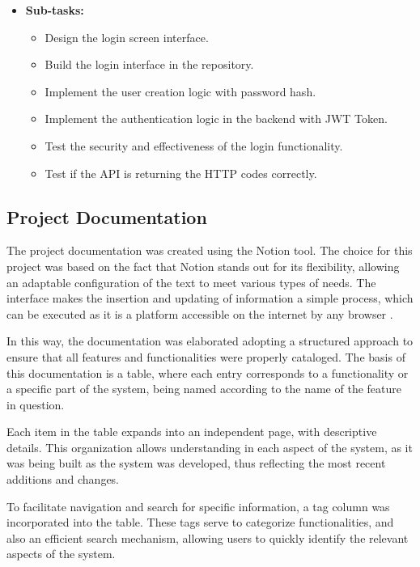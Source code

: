 \begin{itemize}
        \item \textbf{Sub-tasks:}
            \begin{itemize}
                \item Design the login screen interface.
                \item Build the login interface in the repository.
                \item Implement the user creation logic with password hash.
                \item Implement the authentication logic in the backend with \gls{JWT} Token.
                \item Test the security and effectiveness of the login functionality.
                \item Test if the \gls{API} is returning the \gls{HTTP} codes correctly.
            \end{itemize}

\end{itemize}



\subsection{Project Documentation}\label{sec:documentation}
The project documentation was created using the Notion tool. The choice for this project was based on the fact that Notion stands out for its flexibility, allowing an adaptable configuration of the text to meet various types of needs. The interface makes the insertion and updating of information a simple process, which can be executed as it is a platform accessible on the internet by any browser \cite{notionProjectManagement}.

In this way, the documentation was elaborated adopting a structured approach to ensure that all features and functionalities were properly cataloged. The basis of this documentation is a table, where each entry corresponds to a functionality or a specific part of the system, being named according to the name of the feature in question.

Each item in the table expands into an independent page, with descriptive details. This organization allows understanding in each aspect of the system, as it was being built as the system was developed, thus reflecting the most recent additions and changes.

To facilitate navigation and search for specific information, a tag column was incorporated into the table. These tags serve to categorize functionalities, and also an efficient search mechanism, allowing users to quickly identify the relevant aspects of the system.

